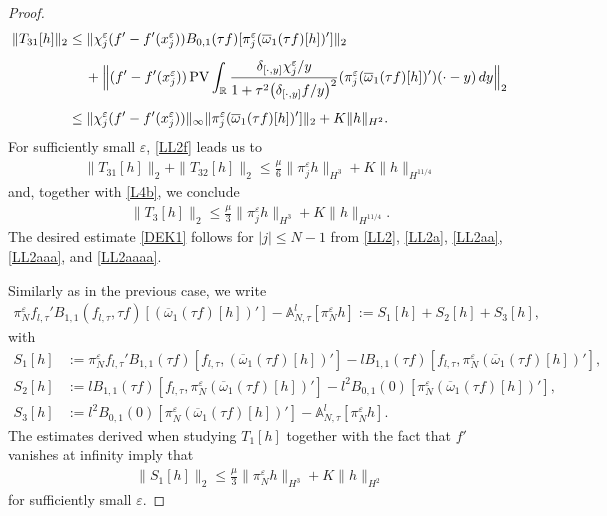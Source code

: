 \documentclass[11pt,reqno]{amsart}
\numberwithin{equation}{section}
\newcommand{\PV}{\mathop{\rm PV}\nolimits}
\newcommand{\0}{\Omega}
\newcommand{\e}{\varepsilon}
\newcommand{\ov}{\overline}
\newcommand{\oo}{\ov\omega}
\newcommand{\bA}{\mathbb{A}}
\newcommand{\R}{\mathbb{R}}
\numberwithin{equation}{section}
\begin{document}
\begin{proof}
\begin{align*}
 \|T_{31}[h]\|_2&\leq\|\chi_j^\e(f'-f'(x_j^\e))B_{0,1}(\tau f)[\pi_j^\e(\oo_1(\tau f)[h])']\|_2\\[1ex]
 &\hspace{0.424cm}+\Big\|(f'-f'(x_j^\e))\PV\int_\R\frac{\delta_{[\cdot,y]}\chi_j^\e/y}{1+\tau^2\big( \delta_{[\cdot,y]} f/y\big)^2} (\pi^\e_j(\oo_1(\tau f)[h])')(\cdot-y) \,dy\Big\|_2\\[1ex]
 &\leq\|\chi_j^\e(f'-f'(x_j^\e))\|_\infty\|\pi_j^\e(\oo_1(\tau f)[h])']\|_2+K\|h\|_{H^2}.
\end{align*}
For   sufficiently small $\e$, \eqref{LL2f} leads us to 
\begin{align*} 
 \|T_{31}[h]\|_2+\|T_{32}[h]\|_2\leq \frac{\mu}{6}\|\pi^\e_j h \|_{H^3}+ K\|h\|_{H^{11/4}}
\end{align*}
and, together with \eqref{L4b}, we conclude  
\begin{align}\label{LL2aaaa}
 \|T_3[h]\|_2\leq  \frac{\mu}{3}\|\pi^\e_j h \|_{H^3}+ K\|h\|_{H^{11/4}}.
\end{align}
The desired estimate \eqref{DEK1} follows for $|j|\leq N-1$ from \eqref{LL2}, \eqref{LL2a}, \eqref{LL2aa}, \eqref{LL2aaa}, and  \eqref{LL2aaaa}.\medskip


    Similarly as in the previous case, we write
\begin{align}\label{LR0}
 \pi_N^\e f_{l,\tau}'B_{1,1}(f_{l,\tau},\tau f)[(\oo_1(\tau f)[h])']-\bA^l_{N,\tau}[\pi^\e_N h]:=S_1[h]+S_2[h]+S_3[h],
\end{align}
with
\begin{align*}
S_1[h]&:= \pi_N^\e f_{l,\tau}'B_{1,1}(\tau f)[f_{l,\tau},(\oo_1(\tau f)[h])'] - lB_{1,1}(\tau f)  [f_{l,\tau},\pi^\e_N(\oo_1(\tau f)[h])' ], \\[1ex]
S_2[h]&:= l B_{1,1}(\tau f)  [f_{l,\tau},\pi^\e_N(\oo_1(\tau f)[h])' ]-l^2B_{0,1}(0)  [\pi^\e_N(\oo_1(\tau f)[h])' ],\\[1ex]
S_3[h]&:= l^2B_{0,1}(0)  [\pi^\e_N(\oo_1(\tau f)[h])' ]-\bA^l_{N,\tau}[\pi^\e_N h].
\end{align*}
The estimates derived when studying $T_1[h]$ together with the fact that $f'$ vanishes at infinity imply that
\begin{align}
  \|S_{1}[h]\|_{2}\leq  \frac{\mu}{3}\|\pi^\e_N h \|_{H^3}+ K\|h\|_{H^2}\label{LR1}
\end{align}
for sufficiently small $\e$. 


\end{proof}
\end{document}
